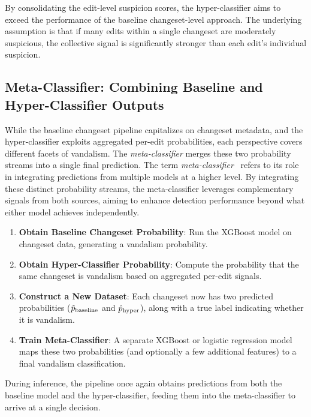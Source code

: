 \documentclass[
    13pt, %
    a4paper, %
    listof=totoc, %
    bibliography=totoc, %
    index=totoc, %
    headsepline
]{scrreprt}
\begin{document}
\noindent
By consolidating the edit-level suspicion scores, the hyper-classifier aims to exceed the performance of the baseline changeset-level approach. The underlying assumption is that if many edits within a single changeset are moderately suspicious, the collective signal is significantly stronger than each edit’s individual suspicion.

\subsection{Meta-Classifier: Combining Baseline and Hyper-Classifier Outputs}
\label{subsec:meta_classifier}

While the baseline changeset pipeline capitalizes on changeset metadata, and the hyper-classifier exploits aggregated per-edit probabilities, each perspective covers different facets of vandalism. The \emph{meta-classifier} merges these two probability streams into a single final prediction. The term \emph{meta-classifier}~\cite{meta_classifier_envisioning} refers to its role in integrating predictions from multiple models at a higher level. By integrating these distinct probability streams, the meta-classifier leverages complementary signals from both sources, aiming to enhance detection performance beyond what either model achieves independently.


\begin{enumerate}
    \item \textbf{Obtain Baseline Changeset Probability}: Run the XGBoost model on changeset data, generating a vandalism probability.
    \item \textbf{Obtain Hyper-Classifier Probability}: Compute the probability that the same changeset is vandalism based on aggregated per-edit signals.
    \item \textbf{Construct a New Dataset}: Each changeset now has two predicted probabilities (\(\hat{p}_{\textnormal{baseline}}\) and \(\hat{p}_{\textnormal{hyper}}\)), along with a true label indicating whether it is vandalism.
    \item \textbf{Train Meta-Classifier}: A separate XGBoost or logistic regression model maps these two probabilities (and optionally a few additional features) to a final vandalism classification.
\end{enumerate}

\noindent
During inference, the pipeline once again obtains predictions from both the baseline model and the hyper-classifier, feeding them into the meta-classifier to arrive at a single decision.
\end{document}
